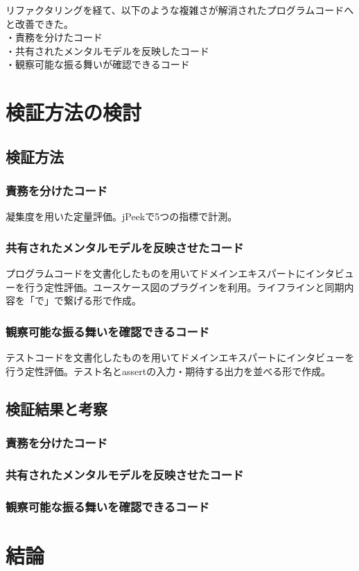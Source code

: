 \documentclass[11pt, a4paper]{jreport}
\begin{document}
リファクタリングを経て、以下のような複雑さが解消されたプログラムコードへと改善できた。
\\・責務を分けたコード
\\・共有されたメンタルモデルを反映したコード
\\・観察可能な振る舞いが確認できるコード

\chapter{検証方法の検討}
\section{検証方法}
\subsection{責務を分けたコード}
凝集度を用いた定量評価。jPeekで5つの指標で計測。
\subsection{共有されたメンタルモデルを反映させたコード}
プログラムコードを文書化したものを用いてドメインエキスパートにインタビューを行う定性評価。ユースケース図のプラグインを利用。ライフラインと同期内容を「で」で繋げる形で作成。
\subsection{観察可能な振る舞いを確認できるコード}
テストコードを文書化したものを用いてドメインエキスパートにインタビューを行う定性評価。テスト名とassertの入力・期待する出力を並べる形で作成。
\section{検証結果と考察}
\subsection{責務を分けたコード}
\subsection{共有されたメンタルモデルを反映させたコード}
\subsection{観察可能な振る舞いを確認できるコード}
\chapter{結論}
\end{document}
